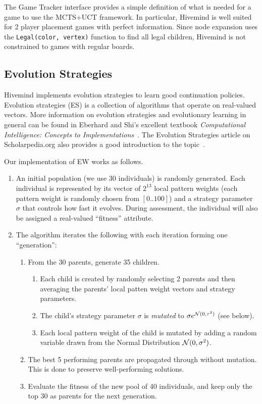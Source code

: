 \documentclass{acm_proc_article-sp}
\begin{document}
The Game Tracker interface provides a simple definition of what is needed for a game to use the MCTS+UCT framework. 
In particular, Hivemind is well suited for 2 player placement games with perfect information. 
Since node expansion uses the \texttt{Legal(color, vertex)} function to find all legal children,
Hivemind is not constrained to games with regular boards.

\subsection{Evolution Strategies}
\label{s:es}

Hivemind implements evolution strategies to learn good continuation policies.
Evolution strategies (ES) is a collection of algorithms that operate on real-valued vectors. 
More information on evolution strategies and evolutionary learning in general can be found in Eberhard and Shi's excellent textbook \emph{Computational Intelligence: Concepts to Implementations}~\cite{eberhart2007computational}. 
The Evolution Strategies article on Scholarpedia.org also provides a good introduction to the topic~\cite{Beyer:2007}.

Our implementation of EW works as follows.
\begin{enumerate}
\item An initial population (we use 30 individuals) is randomly generated. 
Each individual is represented by its vector of $2^{13}$ local pattern weights 
(each pattern weight is randomly chosen from $[0 .. 100]$)
and a strategy parameter $\sigma$ that controls how fast it evolves.
During assessment, the individual will also be assigned a real-valued ``fitness'' attribute.
\item The algorithm iterates the following with each iteration forming one ``generation'':
	\begin{enumerate}
	\item From the 30 parents, generate 35 children.
		\begin{enumerate}
		\item Each child is created by randomly selecting 2 parents and then 
		averaging the parents' local patten weight vectors and strategy parameters.
		\item	The child's strategy parameter $\sigma$ is \emph{mutated} to $\sigma e^{ {\cal N}(0,\tau^2)}$
			(see below).
		\item Each local pattern weight of the child is mutated by adding a random variable drawn from the Normal Distribution
		${\cal N}(0, \sigma^2)$.
		\end{enumerate}
	\item The best 5 performing parents are propagated through without mutation.  This is done to preserve well-performing solutions.
	\item Evaluate the fitness of the new pool of 40 individuals, and keep only the top 30 as parents for the next generation.
	\end{enumerate}
\end{enumerate}
\end{document}

